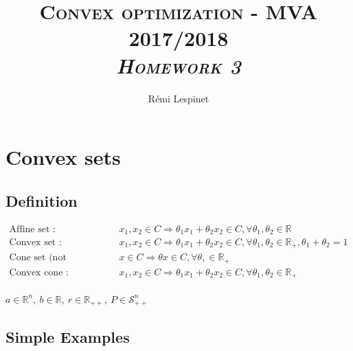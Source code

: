\documentclass[a4paper, 10pt]{article}
\title{\textsc{Convex optimization - MVA 2017/2018 \\ \emph{Homework 3}} }
\author{Rémi Lespinet}
\date{}
\newcommand{\set}[2]{\{ #1 \hspace{.1em} | \hspace{.1em}#2 \}}
\newcommand{\R}{\mathbb{R}}
\newcommand{\Rp}{\mathbb{R}_{+}}
\newcommand{\Rpp}{\mathbb{R}_{++}}
\newcommand{\Rn}{\mathbb{R}^n}
\newcommand{\Snpp}{\mathcal{S}_{++}^n}
\begin{document}
\thispagestyle{fancy}

\section{Convex sets}

\subsection{Definition}

\vspace{-1em}
\begin{equation*}
  \begin{array}{ll}
    \text{Affine set :} & x_1, x_2 \in C \Rightarrow \theta_1 x_1 + \theta_2 x_2 \in C, \forall \theta_1, \theta_2 \in \R\\
    \text{Convex set :} & x_1, x_2 \in C \Rightarrow \theta_1 x_1 + \theta_2 x_2 \in C, \forall \theta_1, \theta_2 \in \Rp, \theta_1 + \theta_2 = 1\\
    \text{Cone set (not necessarly convex) :} & x \in C \Rightarrow \theta x \in C, \forall \theta, \in \Rp\\
    \text{Convex cone :} & x_1, x_2 \in C \Rightarrow \theta_1 x_1 + \theta_2 x_2 \in C, \forall \theta_1, \theta_2 \in \Rp\\
  \end{array}
\end{equation*}

$a \in \Rn,\ b \in \R,\ r \in \Rpp,\ P \in \Snpp$
\subsection{Simple Examples}
\end{document}
